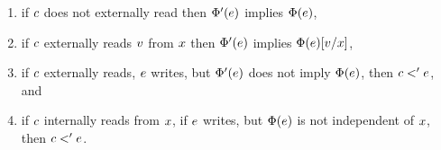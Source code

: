 \begin{definition}
\begin{enumerate}
\item\label{dis-int1} if $c$ does not externally read then
  $\Phi'(e)$ implies $\Phi(e)$,
\item\label{dis-ext1} if $c$ externally reads $v$ from
  $x$ then $\Phi'(e)$ implies
  $\Phi(e)[v/x]$,
\item\label{dis-ext2} if $c$ externally reads, $e$ writes, but
  $\Phi'(e)$ does not imply $\Phi(e)$, then
  $c<'e$, and
\item\label{dis3-int2} if $c$ internally reads from $x$, if $e$
  writes, but $\Phi(e)$ is not independent of $x$, then
  $c<'e$.
\end{enumerate}
\end{definition}

